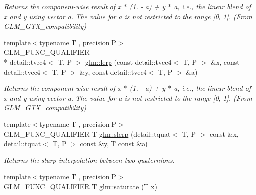 \begin{DoxyCompactItemize}
\begin{DoxyCompactList}\small\item\em Returns the component-\/wise result of x $\ast$ (1. -\/ a) + y $\ast$ a, i.\-e., the linear blend of x and y using vector a. The value for a is not restricted to the range \mbox{[}0, 1\mbox{]}. (From G\-L\-M\-\_\-\-G\-T\-X\-\_\-compatibility) \end{DoxyCompactList}\item 
\hypertarget{group__gtx__compatibility_ga48f60aeee275f1848cfc60a85fde96f2}{{\footnotesize template$<$typename T , precision P$>$ }\\G\-L\-M\-\_\-\-F\-U\-N\-C\-\_\-\-Q\-U\-A\-L\-I\-F\-I\-E\-R \\*
detail\-::tvec4$<$ T, P $>$ \hyperlink{group__gtx__compatibility_ga48f60aeee275f1848cfc60a85fde96f2}{glm\-::lerp} (const detail\-::tvec4$<$ T, P $>$ \&x, const detail\-::tvec4$<$ T, P $>$ \&y, const detail\-::tvec4$<$ T, P $>$ \&a)}\label{group__gtx__compatibility_ga48f60aeee275f1848cfc60a85fde96f2}

\begin{DoxyCompactList}\small\item\em Returns the component-\/wise result of x $\ast$ (1. -\/ a) + y $\ast$ a, i.\-e., the linear blend of x and y using vector a. The value for a is not restricted to the range \mbox{[}0, 1\mbox{]}. (From G\-L\-M\-\_\-\-G\-T\-X\-\_\-compatibility) \end{DoxyCompactList}\item 
{\footnotesize template$<$typename T , precision P$>$ }\\G\-L\-M\-\_\-\-F\-U\-N\-C\-\_\-\-Q\-U\-A\-L\-I\-F\-I\-E\-R T \hyperlink{group__gtx__compatibility_gaa47df8c302c9b42c813da3f658f90e1a}{glm\-::slerp} (detail\-::tquat$<$ T, P $>$ const \&x, detail\-::tquat$<$ T, P $>$ const \&y, T const \&a)
\begin{DoxyCompactList}\small\item\em Returns the slurp interpolation between two quaternions. \end{DoxyCompactList}\item 
\hypertarget{group__gtx__compatibility_ga0fd09e616d122bc2ed9726682ffd44b7}{{\footnotesize template$<$typename T , precision P$>$ }\\G\-L\-M\-\_\-\-F\-U\-N\-C\-\_\-\-Q\-U\-A\-L\-I\-F\-I\-E\-R T \hyperlink{group__gtx__compatibility_ga0fd09e616d122bc2ed9726682ffd44b7}{glm\-::saturate} (T x)}\label{group__gtx__compatibility_ga0fd09e616d122bc2ed9726682ffd44b7}


\end{DoxyCompactItemize}

